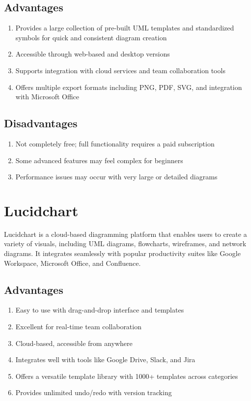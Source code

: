 \subsection{Advantages}
\begin{enumerate}
    \item Provides a large collection of pre-built UML templates and standardized symbols for quick and consistent diagram creation
    \item Accessible through web-based and desktop versions
    \item Supports integration with cloud services and team collaboration tools
    \item Offers multiple export formats including PNG, PDF, SVG, and integration with Microsoft Office
\end{enumerate}

\subsection{Disadvantages}
\begin{enumerate}
    \item Not completely free; full functionality requires a paid subscription
    \item Some advanced features may feel complex for beginners
    \item Performance issues may occur with very large or detailed diagrams
\end{enumerate}

\section{Lucidchart}

Lucidchart is a cloud-based diagramming platform that enables users to create a variety of visuals, including UML diagrams, flowcharts, wireframes, and network diagrams. It integrates seamlessly with popular productivity suites like Google Workspace, Microsoft Office, and Confluence.

\subsection{Advantages}
\begin{enumerate}
    \item Easy to use with drag-and-drop interface and templates
    \item Excellent for real-time team collaboration
    \item Cloud-based, accessible from anywhere
    \item Integrates well with tools like Google Drive, Slack, and Jira
    \item Offers a versatile template library with 1000+ templates across categories
    \item Provides unlimited undo/redo with version tracking
\end{enumerate}

